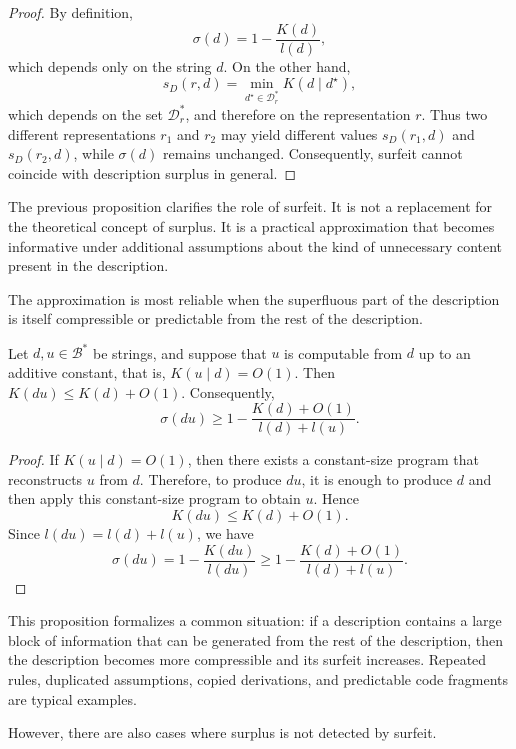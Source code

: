 \begin{proof}
By definition,
\[
\sigma(d)=1-\frac{K(d)}{l(d)},
\]
which depends only on the string \(d\). On the other hand,
\[
s_D(r, d)=\min_{d^\star\in\mathcal D_r^\ast}K(d\mid d^\star),
\]
which depends on the set \(\mathcal D_r^\ast\), and therefore on the representation \(r\). Thus two different representations \(r_1\) and \(r_2\) may yield different values \(s_D(r_1, d)\) and \(s_D(r_2, d)\), while \(\sigma(d)\) remains unchanged. Consequently, surfeit cannot coincide with description surplus in general.
\end{proof}

The previous proposition clarifies the role of surfeit. It is not a replacement for the theoretical concept of surplus. It is a practical approximation that becomes informative under additional assumptions about the kind of unnecessary content present in the description.

The approximation is most reliable when the superfluous part of the description is itself compressible or predictable from the rest of the description.

\begin{proposition}
\label{prop:compressible_appendix_increases_surfeit}
Let \(d,u\in\mathcal B^\ast\) be strings, and suppose that \(u\) is computable from \(d\) up to an additive constant, that is, $K(u\mid d)=O(1)$. Then $K(du)\leq K(d)+O(1)$. Consequently,
\[
\sigma(du)\geq 1-\frac{K(d)+O(1)}{l(d)+l(u)}.
\]
\end{proposition}

\begin{proof}
If \(K(u\mid d)=O(1)\), then there exists a constant-size program that reconstructs \(u\) from \(d\). Therefore, to produce \(du\), it is enough to produce \(d\) and then apply this constant-size program to obtain \(u\). Hence
\[
K(du)\leq K(d)+O(1).
\]
Since \(l(du)=l(d)+l(u)\), we have
\[
\sigma(du)
=
1-\frac{K(du)}{l(du)}
\geq
1-\frac{K(d)+O(1)}{l(d)+l(u)}.
\]
\end{proof}

This proposition formalizes a common situation: if a description contains a large block of information that can be generated from the rest of the description, then the description becomes more compressible and its surfeit increases. Repeated rules, duplicated assumptions, copied derivations, and predictable code fragments are typical examples.

However, there are also cases where surplus is not detected by surfeit.

